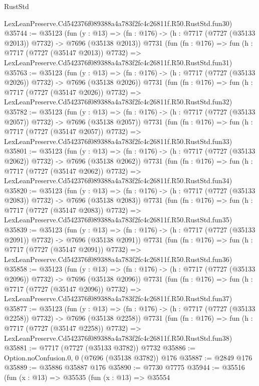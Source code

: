 \begin{lexlean}{RustStd}
\begin{coremodule}
    LexLeanPreserve.Cd542376f089388a4a783f2fc4c26811f.R50.RustStd.fun30)
@35744 := @35123
    (fun (y : @13) =>
    (fn : @176) -> (h : @7717 (@7727 (@35133 @2013)) @7732) -> @7696 (@35138 @2013))
    @7731
    (fun (fn : @176) =>
    fun (h : @7717 (@7727 (@35147 @2013)) @7732) =>
    LexLeanPreserve.Cd542376f089388a4a783f2fc4c26811f.R50.RustStd.fun31)
@35763 := @35123
    (fun (y : @13) =>
    (fn : @176) -> (h : @7717 (@7727 (@35133 @2026)) @7732) -> @7696 (@35138 @2026))
    @7731
    (fun (fn : @176) =>
    fun (h : @7717 (@7727 (@35147 @2026)) @7732) =>
    LexLeanPreserve.Cd542376f089388a4a783f2fc4c26811f.R50.RustStd.fun32)
@35782 := @35123
    (fun (y : @13) =>
    (fn : @176) -> (h : @7717 (@7727 (@35133 @2057)) @7732) -> @7696 (@35138 @2057))
    @7731
    (fun (fn : @176) =>
    fun (h : @7717 (@7727 (@35147 @2057)) @7732) =>
    LexLeanPreserve.Cd542376f089388a4a783f2fc4c26811f.R50.RustStd.fun33)
@35801 := @35123
    (fun (y : @13) =>
    (fn : @176) -> (h : @7717 (@7727 (@35133 @2062)) @7732) -> @7696 (@35138 @2062))
    @7731
    (fun (fn : @176) =>
    fun (h : @7717 (@7727 (@35147 @2062)) @7732) =>
    LexLeanPreserve.Cd542376f089388a4a783f2fc4c26811f.R50.RustStd.fun34)
@35820 := @35123
    (fun (y : @13) =>
    (fn : @176) -> (h : @7717 (@7727 (@35133 @2083)) @7732) -> @7696 (@35138 @2083))
    @7731
    (fun (fn : @176) =>
    fun (h : @7717 (@7727 (@35147 @2083)) @7732) =>
    LexLeanPreserve.Cd542376f089388a4a783f2fc4c26811f.R50.RustStd.fun35)
@35839 := @35123
    (fun (y : @13) =>
    (fn : @176) -> (h : @7717 (@7727 (@35133 @2091)) @7732) -> @7696 (@35138 @2091))
    @7731
    (fun (fn : @176) =>
    fun (h : @7717 (@7727 (@35147 @2091)) @7732) =>
    LexLeanPreserve.Cd542376f089388a4a783f2fc4c26811f.R50.RustStd.fun36)
@35858 := @35123
    (fun (y : @13) =>
    (fn : @176) -> (h : @7717 (@7727 (@35133 @2096)) @7732) -> @7696 (@35138 @2096))
    @7731
    (fun (fn : @176) =>
    fun (h : @7717 (@7727 (@35147 @2096)) @7732) =>
    LexLeanPreserve.Cd542376f089388a4a783f2fc4c26811f.R50.RustStd.fun37)
@35877 := @35123
    (fun (y : @13) =>
    (fn : @176) -> (h : @7717 (@7727 (@35133 @2258)) @7732) -> @7696 (@35138 @2258))
    @7731
    (fun (fn : @176) =>
    fun (h : @7717 (@7727 (@35147 @2258)) @7732) =>
    LexLeanPreserve.Cd542376f089388a4a783f2fc4c26811f.R50.RustStd.fun38)
@35881 := @7717 (@7727 (@35133 @3782)) @7732
@35886 := Option.noConfusion.{0, 0} (@7696 (@35138 @3782)) @176
@35887 := @2849 @176
@35889 := @35886 @35887 @176
@35890 := @7730 @7775
@35944 := @35516
    (fun (x : @13) =>
    @35535
      (fun (x : @13) =>
      @35554

\end{coremodule}
\end{lexlean}
